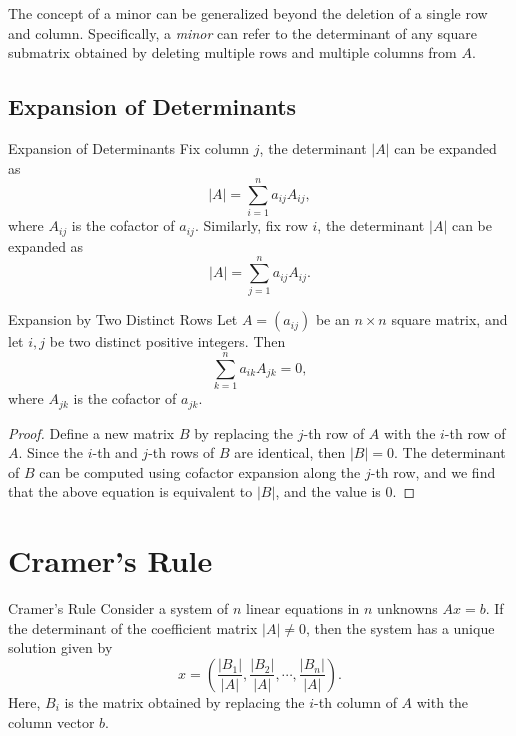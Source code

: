 \begin{note}
  The concept of a minor can be generalized beyond the deletion of a single row
  and column.
  Specifically, a \emph{minor} can refer to the determinant of any square submatrix
  obtained by deleting multiple rows and multiple columns from $A$.
\end{note}

\subsection{Expansion of Determinants}

\begin{proposition}{Expansion of Determinants}{}
  Fix column $j$, the determinant $|A|$ can be expanded as
  \begin{equation}
    |A| = \sum\limits_{i = 1}^n a_{ij} A_{ij},
  \end{equation}
  where $A_{ij}$ is the cofactor of $a_{ij}$.
  Similarly, fix row $i$, the determinant $|A|$ can be expanded as
  \begin{equation}
    |A| = \sum\limits_{j = 1}^n a_{ij} A_{ij}.
  \end{equation}
\end{proposition}

\begin{proposition}{Expansion by Two Distinct Rows}{}
  Let $A = (a_{ij})$ be an $n \times n$ square matrix,
  and let $i, j$ be two distinct positive integers.
  Then
  \begin{equation}
    \sum\limits_{k = 1}^n a_{ik} A_{jk} = 0,
  \end{equation}
  where $A_{jk}$ is the cofactor of $a_{jk}$.
\end{proposition}

\begin{proof}
  Define a new matrix $B$ by replacing the $j$-th row of $A$ with the
  $i$-th row of $A$.
  Since the $i$-th and $j$-th rows of $B$ are identical, then $|B| = 0$.
  The determinant of $B$ can be computed using cofactor expansion along the
  $j$-th row, and we find that the above equation is equivalent to $|B|$,
  and the value is $0$.
\end{proof}

\section{Cramer's Rule}

\begin{theorem}{Cramer's Rule}{}
  Consider a system of $n$ linear equations in $n$ unknowns $Ax = b$.
  If the determinant of the coefficient matrix $|A| \neq 0$,
  then the system has a unique solution given by
  \begin{equation}
    x = \left( \frac{|B_1|}{|A|}, \frac{|B_2|}{|A|}, \cdots, \frac{|B_n|}{|A|} \right).
  \end{equation}
  Here, $B_i$ is the matrix obtained by replacing the $i$-th column of $A$
  with the column vector $b$.
\end{theorem}

